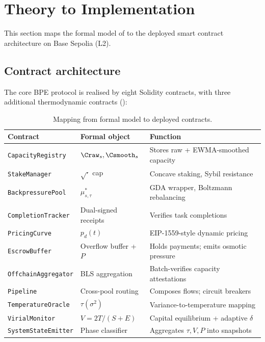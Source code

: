 \section{Theory to Implementation}
\label{sec:implementation}

This section maps the formal model of 
to the deployed smart contract architecture on Base Sepolia (L2).

\subsection{Contract architecture}

The core BPE protocol is realised by eight Solidity contracts,
with three additional thermodynamic contracts ():

\begin{table}[h]
\centering
\small
\begin{tabular}{lll}
\toprule
\textbf{Contract} & \textbf{Formal object} & \textbf{Function} \\
\midrule
\texttt{CapacityRegistry} & $\Craw_s, \Csmooth_s$ & Stores raw + EWMA-smoothed capacity \\
\texttt{StakeManager} & $\sqrt{\cdot}$ cap & Concave staking, Sybil resistance \\
\texttt{BackpressurePool} & $\mu^*_{s,\tau}$ & GDA wrapper, Boltzmann rebalancing \\
\texttt{CompletionTracker} & Dual-signed receipts & Verifies task completions \\
\texttt{PricingCurve} & $p_d(t)$ & EIP-1559-style dynamic pricing \\
\texttt{EscrowBuffer} & Overflow buffer + $P$ & Holds payments; emits osmotic pressure \\
\texttt{OffchainAggregator} & BLS aggregation & Batch-verifies capacity attestations \\
\texttt{Pipeline} & Cross-pool routing & Composes flows; circuit breakers \\
\midrule
\texttt{TemperatureOracle} & $\tau(\sigma^2)$ & Variance-to-temperature mapping \\
\texttt{VirialMonitor} & $V = 2T/(S+E)$ & Capital equilibrium + adaptive $\delta$ \\
\texttt{SystemStateEmitter} & Phase classifier & Aggregates $\tau, V, P$ into snapshots \\
\bottomrule
\end{tabular}
\caption{Mapping from formal model to deployed contracts.}
\label{tab:contract-map}
\end{table}

